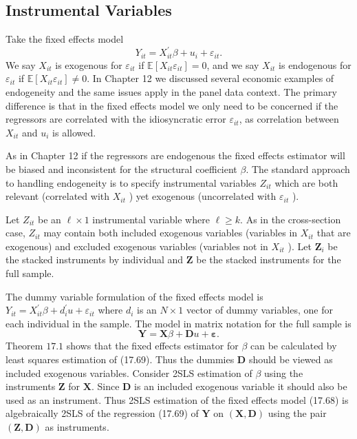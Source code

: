 \documentclass[10pt]{article}
\begin{document}
\subsection{Instrumental Variables}
Take the fixed effects model
$$
Y_{i t}=X_{i t}^{\prime} \beta+u_{i}+\varepsilon_{i t} .
$$
We say $X_{i t}$ is exogenous for $\varepsilon_{i t}$ if $\mathbb{E}\left[X_{i t} \varepsilon_{i t}\right]=0$, and we say $X_{i t}$ is endogenous for $\varepsilon_{i t}$ if $\mathbb{E}\left[X_{i t} \varepsilon_{i t}\right] \neq 0$. In Chapter 12 we discussed several economic examples of endogeneity and the same issues apply in the panel data context. The primary difference is that in the fixed effects model we only need to be concerned if the regressors are correlated with the idiosyncratic error $\varepsilon_{i t}$, as correlation between $X_{i t}$ and $u_{i}$ is allowed.

As in Chapter 12 if the regressors are endogenous the fixed effects estimator will be biased and inconsistent for the structural coefficient $\beta$. The standard approach to handling endogeneity is to specify instrumental variables $Z_{i t}$ which are both relevant (correlated with $X_{i t}$ ) yet exogenous (uncorrelated with $\varepsilon_{i t}$ ).

Let $Z_{i t}$ be an $\ell \times 1$ instrumental variable where $\ell \geq k$. As in the cross-section case, $Z_{i t}$ may contain both included exogenous variables (variables in $X_{i t}$ that are exogenous) and excluded exogenous variables (variables not in $X_{i t}$ ). Let $\boldsymbol{Z}_{i}$ be the stacked instruments by individual and $\boldsymbol{Z}$ be the stacked instruments for the full sample.

The dummy variable formulation of the fixed effects model is $Y_{i t}=X_{i t}^{\prime} \beta+d_{i}^{\prime} u+\varepsilon_{i t}$ where $d_{i}$ is an $N \times 1$ vector of dummy variables, one for each individual in the sample. The model in matrix notation for the full sample is
$$
\boldsymbol{Y}=\boldsymbol{X} \beta+\boldsymbol{D} u+\boldsymbol{\varepsilon} .
$$
Theorem $17.1$ shows that the fixed effects estimator for $\beta$ can be calculated by least squares estimation of (17.69). Thus the dummies $\boldsymbol{D}$ should be viewed as included exogenous variables. Consider 2SLS estimation of $\beta$ using the instruments $\boldsymbol{Z}$ for $\boldsymbol{X}$. Since $\boldsymbol{D}$ is an included exogenous variable it should also be used as an instrument. Thus 2SLS estimation of the fixed effects model (17.68) is algebraically 2SLS of the regression (17.69) of $\boldsymbol{Y}$ on $(\boldsymbol{X}, \boldsymbol{D})$ using the pair $(\boldsymbol{Z}, \boldsymbol{D})$ as instruments.
\end{document}
